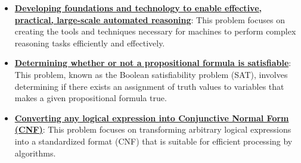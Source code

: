 \documentclass{article}%
\begin{document}
\begin{itemize}[leftmargin=*]%
\item \href{https://purdue.brightspace.com/d2l/common/assets/pdfjs-d2l-dist/1.0.14-legacy/web/viewer.html?file=\%2Fcontent\%2Fenforced\%2F1095467-wl.202510.CS.24300.001\%2F13L1-Logic.pdf\%3Fou\%3D1095467\&lang=en-us\&container=d2l-fileviewer-rendered-pdf\&fullscreen=d2l-fileviewer-rendered-pdf-dialog\&height=667#page=4}{\textbf{Developing foundations and technology to enable effective, practical, large{-}scale automated reasoning}}: This problem focuses on creating the tools and techniques necessary for machines to perform complex reasoning tasks efficiently and effectively.%
\item \href{https://purdue.brightspace.com/d2l/common/assets/pdfjs-d2l-dist/1.0.14-legacy/web/viewer.html?file=\%2Fcontent\%2Fenforced\%2F1095467-wl.202510.CS.24300.001\%2F13L1-Logic.pdf\%3Fou\%3D1095467\&lang=en-us\&container=d2l-fileviewer-rendered-pdf\&fullscreen=d2l-fileviewer-rendered-pdf-dialog\&height=667#page=15}{\textbf{Determining whether or not a propositional formula is satisfiable}}: This problem, known as the Boolean satisfiability problem (SAT), involves determining if there exists an assignment of truth values to variables that makes a given propositional formula true.%
\item \href{https://purdue.brightspace.com/d2l/common/assets/pdfjs-d2l-dist/1.0.14-legacy/web/viewer.html?file=\%2Fcontent\%2Fenforced\%2F1095467-wl.202510.CS.24300.001\%2F13L1-Logic.pdf\%3Fou\%3D1095467\&lang=en-us\&container=d2l-fileviewer-rendered-pdf\&fullscreen=d2l-fileviewer-rendered-pdf-dialog\&height=667#page=16}{\textbf{Converting any logical expression into Conjunctive Normal Form (CNF)}}: This problem focuses on transforming arbitrary logical expressions into a standardized format (CNF) that is suitable for efficient processing by algorithms.%
\end{itemize}%
\end{document}
